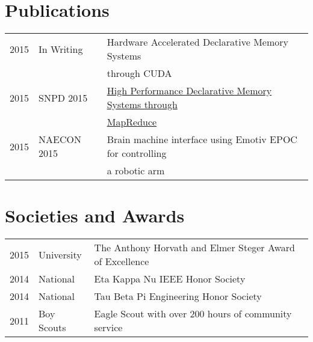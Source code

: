 \documentclass[letterpaper]{deedy-resume} %
\begin{document}
\begin{minipage}[t]{0.66\textwidth}
\sectionspace %



\section{Publications} 

\begin{tabular}{rll}
2015 	 & In Writing  & Hardware Accelerated Declarative Memory Systems \\
 		 & 			   & through CUDA\\
2015	 & SNPD 2015   & \href{http://ieeexplore.ieee.org/xpl/articleDetails.jsp?arnumber=7176183}{High Performance Declarative Memory Systems through}\\
 		 & 			   & \href{http://ieeexplore.ieee.org/xpl/articleDetails.jsp?arnumber=7176183}{MapReduce}\\
2015 	 & NAECON 2015 & Brain machine interface using Emotiv EPOC for controlling \\
		 & 			   & a robotic arm
\end{tabular}

\sectionspace %


\section{Societies and Awards} 

\begin{tabular}{rll}
2015 & University & The Anthony Horvath and Elmer Steger Award of Excellence \\
2014 & National & Eta Kappa Nu IEEE Honor Society\\
2014 & National & Tau Beta Pi Engineering Honor Society\\
2011 & Boy Scouts & Eagle Scout with over 200 hours of community service\\
\end{tabular}

\sectionspace %


\end{minipage} %
\end{document}
